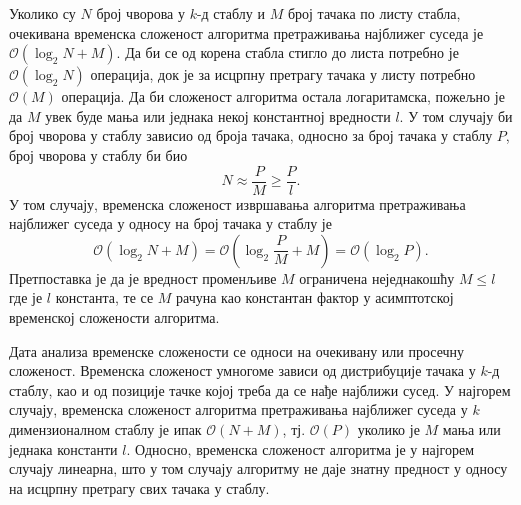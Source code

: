 \documentclass[master]{finthesis}
\newcommand*{\kdim}[1]{\texorpdfstring{$k$\Hyphdash}{k-}димензионал#1}
\newcommand*{\kd}{\texorpdfstring{$k$}{k}-д }
\begin{document}
\smallskip
Уколико су $N$ број чворова у \kd стаблу и $M$ број тачака по листу стабла, очекивана временска сложеност алгоритма претраживања најближег суседа је $\mathcal{O}(\log_2\!N + M)$. Да би се од корена стабла стигло до листа потребно је $\mathcal{O}(\log_2\!N)$ операција, док је за исцрпну претрагу тачака у листу потребно $\mathcal{O}(M)$ операција. Да би сложеност алгоритма остала логаритамска, пожељно је да $M$ увек буде мања или једнака некој константној вредности $l$. У том случају би број чворова у стаблу зависио од броја тачака, односно за број тачака у стаблу $P$, број чворова у стаблу би био $$N \approx \frac{P}{M} \ge \frac{P}{l}.$$ У том случају, временска сложеност извршавања алгоритма претраживања најближег суседа у односу на број тачака у стаблу је $$\mathcal{O}(\log_2\!N + M) = \mathcal{O}(\log_2\!\frac{P}{M} + M) = \mathcal{O}(\log_2\!P).$$ Претпоставка је да је вредност променљиве $M$ ограничена неједнакошћу $M \le l$ где је $l$ константа, те се $M$ рачуна као константан фактор у асимптотској временској сложености алгоритма.

Дата анализа временске сложености се односи на очекивану или просечну сложеност. Временска сложеност умногоме зависи од дистрибуције тачака у \kd стаблу, као и од позиције тачке којој треба да се нађе најближи сусед. У најгорем случају, временска сложеност алгоритма претраживања најближег суседа у \kdim{ном} стаблу је ипак $\mathcal{O}(N + M)$, тј. $\mathcal{O}(P)$ уколико је $M$ мања или једнака константи $l$. Односно, временска сложеност алгоритма је у најгорем случају линеарна, што у том случају алгоритму не даје знатну предност у односу на исцрпну претрагу свих тачака у стаблу.
\end{document}
